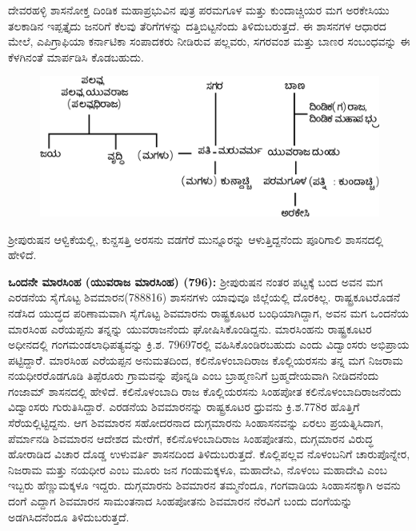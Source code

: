 ದೇವರಹಳ್ಳಿ ಶಾಸನೋಕ್ತ ದಿಂಡಿಕ ಮಹಾಪ್ರಭುವಿನ ಪುತ್ರ ಪರಮಗೂಳ ಮತ್ತು ಕುಂದಾಚ್ಚಿಯರ ಮಗ ಅರಕೇಸಿಯು ತಲಕಾಡಿನ ಇಪ್ಪತ್ತೈದು ಜನರಿಗೆ ಕೆಲವು ತೆರಿಗೆಗಳನ್ನು ದತ್ತಿಬಿಟ್ಟನೆಂದು ತಿಳಿದುಬರುತ್ತದೆ. ಈ ಶಾಸನಗಳ ಆಧಾರದ ಮೇಲೆ, ಎಪಿಗ್ರಾಫಿಯಾ ಕರ್ನಾಟಿಕಾ ಸಂಪಾದಕರು ನೀಡಿರುವ ಪಲ್ಲವರು, ಸಗರವಂಶ ಮತ್ತು ಬಾಣರ ಸಂಬಂಧವನ್ನು ಈ ಕೆಳಗಿನಂತೆ ಮಾರ್ಪಡಿಸಿ ಕೊಡಬಹುದು.

\begin{figure}[!h]
\includegraphics{"images/chap2/1.jpg"}
\end{figure}

ಶ‍್ರೀಪುರುಷನ ಆಳ್ವಿಕೆಯಲ್ಲಿ, ಕುನ್ದಸತ್ತಿ ಅರಸನು ವಡಗೆರೆ ಮುನ್ನೂರನ್ನು ಆಳುತ್ತಿದ್ದನೆಂದು ಪೂರಿಗಾಲಿ ಶಾಸನದಲ್ಲಿ ಹೇಳಿದೆ.

\textbf{ ಒಂದನೇ ಮಾರಸಿಂಹ (ಯುವರಾಜ ಮಾರಸಿಂಹ) (796):} ಶ‍್ರೀಪುರುಷನ ನಂತರ ಪಟ್ಟಕ್ಕೆ ಬಂದ ಅವನ ಮಗ ಎರಡನೆಯ ಸೈಗೊಟ್ಟ ಶಿವಮಾರನ(788\enginline{-}816) ಶಾಸನಗಳು ಯಾವುವೂ ಜಿಲ್ಲೆಯಲ್ಲಿ ದೊರಕಿಲ್ಲ. ರಾಷ್ಟ್ರಕೂಟರೊಡನೆ ನಡೆಸಿದ ಯುದ್ಧದ ಪರಿಣಾಮವಾಗಿ ಸೈಗೊಟ್ಟ ಶಿವಮಾರನು ರಾಷ್ಟ್ರಕೂಟರ ಬಂಧಿಯಾಗಿದ್ದಾಗ, ಅವನ ಮಗ ಒಂದನೆಯ ಮಾರಸಿಂಹ ಎರೆಯಪ್ಪನು ತನ್ನನ್ನು ಯುವರಾಜನೆಂದು ಘೋಷಿಸಿಕೊಂಡಿದ್ದನು. ಮಾರಸಿಂಹನು ರಾಷ್ಟ್ರಕೂಟರ ಅಧೀನದಲ್ಲಿ ಗಂಗಮಂಡಲಾಧಿಪತ್ಯವನ್ನು ಕ್ರಿ.ಶ. 796\enginline{-}97ರಲ್ಲಿ ವಹಿಸಿಕೊಂಡಿರಬಹುದು ಎಂದು ವಿದ್ವಾಂಸರು ಅಭಿಪ್ರಾಯ ಪಟ್ಟಿದ್ದಾರೆೆ. ಮಾರಸಿಂಹ ಎರೆಯಪ್ಪನ ಅನುಮತದಿಂದ, ಕಲಿನೊಳಂಬಾದಿರಾಜ ಕೊಲ್ಲಿಯರಸನು ತನ್ನ ಮಗ ನಿಜರಾಮ ನಯಧೀರರೊಡ\-ಗೂಡಿ ತಿಪ್ಪೆರೂರು ಗ್ರಾಮವನ್ನು ಪೊನ್ನಡಿ ಎಂಬ ಬ್ರಾಹ್ಮಣನಿಗೆ ಬ್ರಹ್ಮದೇಯವಾಗಿ ನೀಡಿದನೆಂದು ಗಂಜಾಮ್ ಶಾಸನದಲ್ಲಿ ಹೇಳಿದೆ. ಕಲಿನೊಳಂಬಾದಿ ರಾಜ ಕೊಲ್ಲಿಯರಸನು ಸಿಂಹಪೋತ ಕಲಿನೊಳಂಬಾದಿರಾಜನೆಂದು ವಿದ್ವಾಂಸರು ಗುರುತಿಸಿದ್ದಾರೆ. ಎರಡನೆಯ ಶಿವಮಾರನನ್ನು ರಾಷ್ಟ್ರಕೂಟರ ಧ್ರುವನು ಕ್ರಿ.ಶ.778ರ ಹೊತ್ತಿಗೆ ಸೆರೆಯಲ್ಲಿಟ್ಟಿದ್ದನು. ಆಗ ಶಿವಮಾರನ ಸಹೋದರನಾದ ದುಗ್ಗಮಾರನು ಸಿಂಹಾಸನವನ್ನು ಏರಲು ಪ್ರಯತ್ನಿಸಿದಾಗ, ಪೆರ್ಮಾನಡಿ ಶಿವಮಾರನ ಆದೇಶದ ಮೇರೆಗೆ, ಕಲಿನೊಳಂಬಾದಿರಾಜ ಸಿಂಹಪೋತನು, ದುಗ್ಗಮಾರನ ವಿರುದ್ಧ ಹೋರಾಡಿದ ವಿಚಾರ ದೊಡ್ಡ ಉಳುವರ್ತಿ ಶಾಸನದಿಂದ ತಿಳಿದುಬರುತ್ತದೆ. ಕೊಲ್ಲಿಪಲ್ಲವ ನೊಳಂಬನಿಗೆ ಚಾರುಪೊನ್ನೇರ, ನಿಜರಾಮ ಮತ್ತು ನಯಧೀರ ಎಂಬ ಮೂರು ಜನ ಗಂಡುಮಕ್ಕಳೂ, ಮಹಾದೇವಿ, ನೊಳಂಬ ಮಹಾದೇವಿ ಎಂಬ ಇಬ್ಬರು ಹೆಣ್ಣುಮಕ್ಕಳೂ ಇದ್ದರು. ದುಗ್ಗಮಾರನು ಶಿವಮಾರನ ತಮ್ಮನೆಂದೂ, ಗಂಗವಾಡಿಯ ಸಿಂಹಾಸನಕ್ಕಾಗಿ ಅವನು ದಂಗೆ ಎದ್ದಾಗ ಶಿವಮಾರನ ಸಾಮಂತನಾದ ಸಿಂಹಪೋತನು ಶಿವಮಾರನ ನೆರವಿಗೆ ಬಂದು ದಂಗೆಯನ್ನು ಅಡಗಿಸಿದನೆಂದೂ ತಿಳಿದುಬರುತ್ತದೆ.

